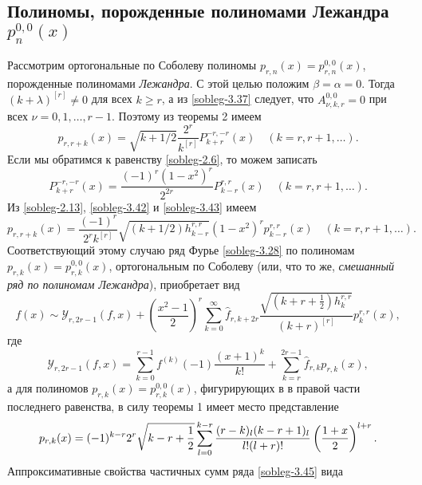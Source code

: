 \subsection{ Полиномы, порожденные полиномами Лежандра $p_{n}^{0,0}(x)$}

 Рассмотрим ортогональные по Соболеву полиномы $p_{r,n}(x)=p_{r,n}^{0,0}(x)$, порожденные полиномами \textit{ Лежандра}. С этой целью положим $\beta=\alpha=0$. Тогда  $(k+\lambda)^{[r]}\neq0$ для всех $k\ge r$, а из \eqref{sobleg-3.37} следует, что $A_{\nu,k,r}^{0,0}=0$ при всех  $\nu=0,1,\dots, r-1$. Поэтому из теоремы 2 имеем
\begin{equation}\label{sobleg-3.42}
p_{r,r+k}(x) =\sqrt{k+1/2}
\frac{2^r}{k^{[r]}}P_{k+r}^{-r,-r}(x) \quad (k=r,r+1,\ldots).
\end{equation}
Если мы обратимся к равенству \eqref{sobleg-2.6}, то можем записать
\begin{equation}\label{sobleg-3.43}
P_{k+r}^{-r,-r}(x)= \frac{(-1)^r(1-x^2)^r}{2^{2r}}P_{k-r}^{r,r}(x) \quad (k=r,r+1,\ldots).
\end{equation}
Из \eqref{sobleg-2.13}, \eqref{sobleg-3.42} и \eqref{sobleg-3.43} имеем
\begin{equation}\label{sobleg-3.44}
p_{r,r+k}(x) =
\frac{(-1)^r}{2^rk^{[r]}}\sqrt{(k+1/2)h_{k-r}^{r,r}}(1-x^2)^rp_{k-r}^{r,r}(x) \quad (k=r,r+1,\ldots).
\end{equation}
Соответствующий этому случаю ряд Фурье \eqref{sobleg-3.28} по полиномам $p_{r,k}(x)=p_{r,k}^{0,0}(x)$, ортогональным по Соболеву (или, что то же, \textit{ смешанный ряд по полиномам  Лежандра}), приобретает вид
\begin{equation}\label{sobleg-3.45}
f(x)\sim \mathcal{ Y}_{r,2r-1}(f,x)+\left(\frac{x^2-1}2\right)^r\sum_{k=0}^\infty\hat f_{r,k+2r} \frac{\sqrt{(k+r+\frac12)h_k^{r,r}}}{ (k+r)^{[r]}}p_{k}^{r,r}(x),
\end{equation}
где
\begin{equation*}
 \mathcal{ Y}_{r,2r-1}(f,x)=\sum_{k=0}^{r-1} f^{(k)}(-1)\frac{(x+1)^k}{k!}+\sum_{k=r}^{2r-1} \hat f_{r,k}p_{r,k}(x),
\end{equation*}
а для полиномов $p_{r,k}(x)=p_{r,k}^{0,0}(x)$, фигурирующих в в правой части последнего равенства, в силу теоремы 1 имеет место представление
\begin{equation}\label{sobleg-3.46}
p_{r,k}(x)=(-1)^{k-r}2^{r}\sqrt{k-r+\frac12}
\sum_{l=0}^{k-r}{(r-k)_l(k-r+1)_l\over l!(l+r)!}
\left({1+x\over 2}\right)^{l+r}.
\end{equation}
Аппроксимативные свойства частичных сумм ряда \eqref{sobleg-3.45} вида

